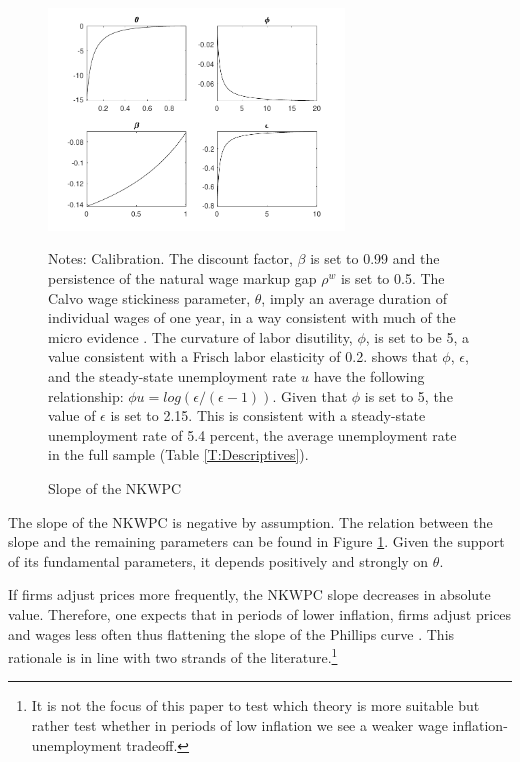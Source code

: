 \documentclass[12pt]{article}
\newcommand{\annote}[1]{\parbox{\textwidth}{\renewcommand{\baselinestretch}{1.0}\vspace{12pt} \footnotesize Notes: #1}}
\begin{document}
\begin{appendices}
\begin{figure}[ht!]
	\centering
	\caption{Slope of the NKWPC \label{F:NKWPCslope}}
	\includegraphics[width=0.7\textwidth]{../Output/Figures/NKWPCslope.pdf} 
	\annote{\footnotesize Calibration. The discount factor, $\beta$ is set to 0.99 and the persistence of the natural wage markup gap $\rho^w$ is set to 0.5. The Calvo wage stickiness parameter, $\theta$, imply an average duration of individual wages of one year, in a way consistent with much of the micro evidence \cite{Nakamura2008}. The curvature of labor disutility, $\phi$, is set to be 5, a value consistent with a Frisch labor elasticity of 0.2. \cite{Gali2011} shows that $\phi$, $\epsilon$, and the steady-state unemployment rate $u$ have the following relationship: $\phi u = log(\epsilon / (\epsilon -1))$. Given that $\phi$ is set to 5, the value of $\epsilon$ is set to 2.15. This is consistent with a steady-state unemployment rate of 5.4 percent, the average unemployment rate in the full sample (Table \ref{T:Descriptives}). }
\end{figure}


The slope of the NKWPC is negative by assumption. The relation between the slope and the remaining parameters can be found in Figure \ref{F:NKWPCslope}. Given the support of its fundamental parameters, it depends positively and strongly on $\theta$. 

If firms adjust prices more frequently, the NKWPC slope decreases in absolute value. Therefore, one expects that in periods of lower inflation, firms adjust prices and wages less often thus flattening the slope of the Phillips curve \citep{Benati2007}. This rationale is in line with two strands of the literature.\footnote{It is not the focus of this paper to test which theory is more suitable but rather test whether in periods of low inflation we see a weaker wage inflation-unemployment tradeoff.}


\end{appendices}
\end{document}
